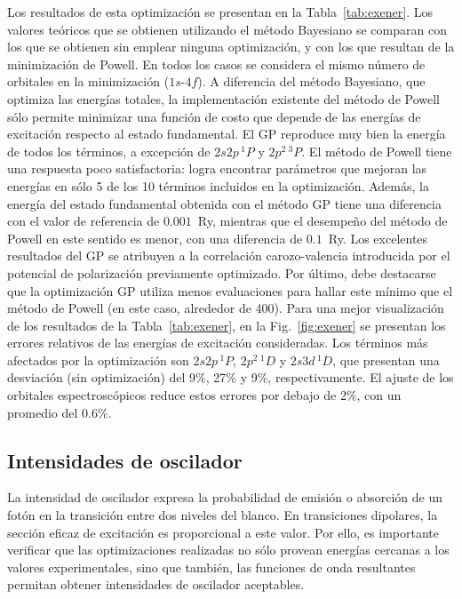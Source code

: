 Los resultados de esta optimización se presentan en la 
Tabla~\ref{tab:exener}. Los valores teóricos que se obtienen utilizando 
el método Bayesiano se comparan con los que se obtienen sin emplear 
ninguna optimización, y con los que resultan de la minimización de 
Powell. En todos los casos se considera el mismo número de orbitales en 
la minimización ($1s$-$4f$). A diferencia del método Bayesiano, que 
optimiza las energías totales, la implementación existente del método de 
Powell sólo permite minimizar una función de costo que depende de las 
energías de excitación respecto al estado fundamental. El GP reproduce 
muy bien la energía de todos los términos, a excepción de $2s2p\,^1\!P$ 
y $2p^2\,^3\!P$. El método de Powell tiene una respuesta poco 
satisfactoria: logra encontrar parámetros que mejoran las energías en 
sólo 5 de los 10 términos incluidos en la optimización. Además, la 
energía del estado fundamental obtenida con el método GP tiene una 
diferencia con el valor de referencia de $0.001$~Ry, mientras que el 
desempeño del método de Powell en este sentido es menor, con una 
diferencia de $0.1$~Ry. Los excelentes resultados del GP se atribuyen a 
la correlación carozo-valencia introducida por el potencial de 
polarización previamente optimizado. Por último, debe destacarse que la 
optimización GP utiliza menos evaluaciones para hallar este mínimo que 
el método de Powell (en este caso, alrededor de 400). Para una mejor 
visualización de los resultados de la Tabla~\ref{tab:exener}, en la 
Fig.~\ref{fig:exener} se presentan los errores relativos de las energías 
de excitación consideradas. Los términos más afectados por la 
optimización son $2s2p\,^1\!P$, $2p^2\,^1\!D$ y $2s3d\,^1\!D$, que 
presentan una desviación (sin optimización) del 9\%, 27\% y 9\%, 
respectivamente. El ajuste de los orbitales espectroscópicos reduce 
estos errores por debajo de 2\%, con un promedio del $0.6\%$. 

\subsection{Intensidades de oscilador}

La intensidad de oscilador expresa la probabilidad de emisión o 
absorción de un fotón en la transición entre dos niveles del blanco. En 
transiciones dipolares, la sección eficaz de excitación es proporcional 
a este valor. Por ello, es importante verificar que las optimizaciones 
realizadas no sólo provean energías cercanas a los valores 
experimentales, sino que también, las funciones de onda resultantes 
permitan obtener intensidades de oscilador aceptables.

